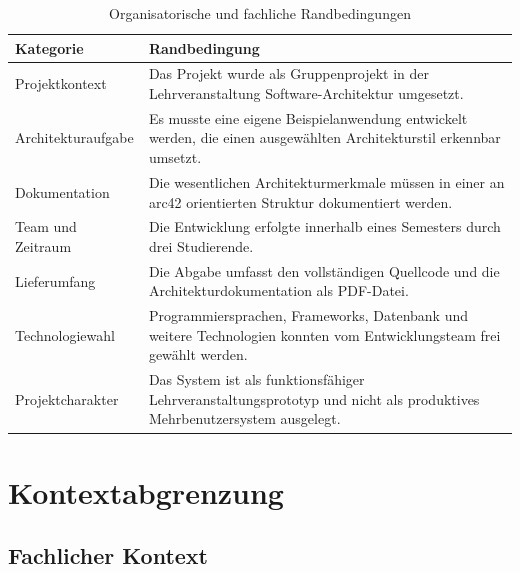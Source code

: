 \documentclass[a4paper,11pt]{article}
\begin{document}
\begin{table}[H]
\centering
\begin{tabularx}{\textwidth}{L{3.8cm} Y}
\toprule
\textbf{Kategorie} & \textbf{Randbedingung} \\
\midrule

Projektkontext &
Das Projekt wurde als Gruppenprojekt in der Lehrveranstaltung Software-Architektur umgesetzt. \\

Architekturaufgabe &
Es musste eine eigene Beispielanwendung entwickelt werden, die einen ausgewählten Architekturstil erkennbar umsetzt. \\

Dokumentation &
Die wesentlichen Architekturmerkmale müssen in einer an arc42 orientierten Struktur dokumentiert werden. \\

Team und Zeitraum &
Die Entwicklung erfolgte innerhalb eines Semesters durch drei Studierende. \\

Lieferumfang &
Die Abgabe umfasst den vollständigen Quellcode und die Architekturdokumentation als PDF-Datei. \\

Technologiewahl &
Programmiersprachen, Frameworks, Datenbank und weitere Technologien konnten vom Entwicklungsteam frei gewählt werden. \\

Projektcharakter &
Das System ist als funktionsfähiger Lehrveranstaltungsprototyp und nicht als produktives Mehrbenutzersystem ausgelegt. \\

\bottomrule
\end{tabularx}
\caption{Organisatorische und fachliche Randbedingungen}
\label{tab:constraints}
\end{table}






\newpage
\section{Kontextabgrenzung}
\subsection{Fachlicher Kontext}
\end{document}
